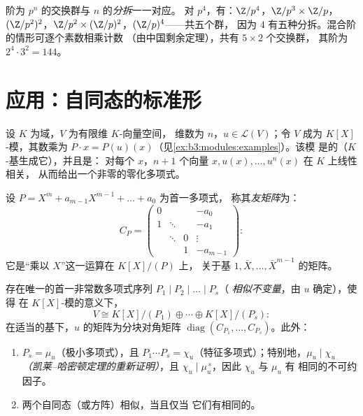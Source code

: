 \begin{example}\label{ex:b3:modules:abelian}
阶为 $p^n$ 的交换群与 $n$ 的\emph{分拆}一一对应。
对 $p^4$，有：$\Z/p^4$，$\Z/p^3\times\Z/p$，
$(\Z/p^2)^2$，$\Z/p^2 \times (\Z/p)^2$，$(\Z/p)^4$——共五个群，
因为 $4$ 有五种分拆。混合阶的情形可逐个素数相乘计数
（由中国剩余定理），共有 $5 \times 2$ 个交换群，
其阶为 $2^4 \cdot 3^2 = 144$。
\end{example}

\section{应用：自同态的标准形}

设 $K$ 为域，$V$ 为有限维 $K$-向量空间，
维数为 $n$，$u \in \mathcal L(V)$；令 $V$ 成为 $K[X]$-模，其数乘为 $P
\cdot x = P(u)(x)$（见\cref{ex:b3:modules:examples}）。该模
是的（$K$-基生成它），并且是：
对每个 $x$，$n+1$ 个向量 $x, u(x), \dots, u^n(x)$ 在 $K$ 上线性相关，
从而给出一个非零的零化多项式。

\begin{definition}\label{def:b3:modules:companion}
设 $P = X^m + a_{m-1}X^{m-1} + \dots + a_0$ 为首一多项式，
称其\emph{友矩阵}为：
\[
C_P = \begin{pmatrix}
0 & & & -a_0\\
1 & \ddots & & -a_1\\
& \ddots & 0 & \vdots\\
& & 1 & -a_{m-1}
\end{pmatrix} :
\]
它是“乘以 $X$”这一运算在 $K[X]/(P)$ 上，
关于基 $1, \bar X, \dots, \bar X^{m-1}$ 的矩阵。
\end{definition}

\begin{theorem}
\label{thm:b3:modules:frobenius}
存在唯一的首一非常数多项式序列 $P_1
\mid P_2 \mid \dots \mid P_s$（
\emph{相似不变量}，由 $u$ 确定），使得
在 $K[X]$-模的意义下，
\[
V \cong K[X]/(P_1) \oplus \cdots \oplus K[X]/(P_s):
\]
在适当的基下，$u$ 的矩阵为分块对角矩阵
$\operatorname{diag}(C_{P_1}, \dots, C_{P_s})$。此外：
\begin{enumerate}
  \item $P_s = \mu_u$（极小多项式），且 $P_1\cdots P_s =
        \chi_u$（特征多项式）；特别地，$\mu_u
        \mid \chi_u$ \emph{（凯莱–哈密顿定理的重新证明）}，且
        $\chi_u \mid \mu_u^{\,s}$，因此 $\chi_u$ 与 $\mu_u$ 有
        相同的不可约因子。
  \item 两个自同态（或方阵）相似，当且仅当
        它们有相同的。
\end{enumerate}
\end{theorem}

